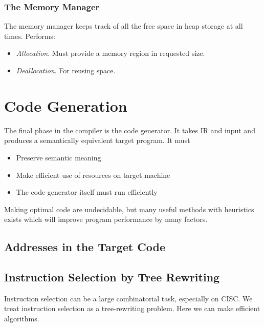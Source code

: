 \documentclass{article}
\begin{document}
\subsubsection{The Memory Manager} %
\label{ssub:The Memory Manager}
The memory manager keeps track of all the free space in heap storage at all times. Performs:
\begin{itemize}
	\item \emph{Allocation}. Must provide a memory region in requested size.
	\item \emph{Deallocation}. For reusing space.
\end{itemize}


\section{Code Generation} %
\label{sec:Code Generation}
The final phase in the compiler is the code generator. It takes IR and input and produces a semantically equivalent target program. It must
\begin{itemize}
	\item Preserve semantic meaning
	\item Make efficient use of resources on target machine
	\item The code generator itself must run efficiently
\end{itemize}
Making optimal code are undecidable, but many useful methods with heuristics exists which will improve program performance by many factors.

\subsection{Addresses in the Target Code} %
\label{sub:Addresses in the Target Code}


\subsection{Instruction Selection by Tree Rewriting} %
\label{sub:Instruction Selection by Tree Rewriting}
Instruction selection can be a large combinatorial task, especially on CISC. We treat instruction selection as a tree-rewriting problem. Here we can make efficient algorithms.
\end{document}
